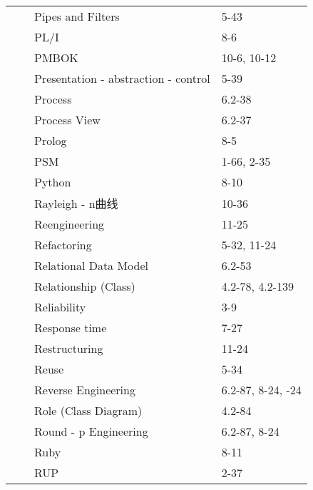 \documentclass[twocolumn]{article}
\begin{document}
\begin{tabular}{ | >{\bfseries}m{0.5em} | >{\bfseries}m{1em} | m{12em} | m{8em} |}
 &  & Pipes and Filters & 5-43\\ \cline{3-4}
 &  & PL/I & 8-6\\ \cline{3-4}
 &  & PMBOK & 10-6, 10-12\\ \cline{3-4}
 &  & Presentation - abstraction  \newline  - control & 5-39\\ \cline{3-4}
 &  & Process & 6.2-38\\ \cline{3-4}
 &  & Process View & 6.2-37\\ \cline{3-4}
 &  & Prolog & 8-5\\ \cline{3-4}
 &  & PSM & 1-66, 2-35\\ \cline{3-4}
 &  & Python & 8-10\\ \cline{2-4}
 & \multirow{14}{1em}{R \newline  \newline  \newline  \newline  \newline R \newline  \newline  \newline  \newline  \newline R} & Rayleigh - n曲线 & 10-36\\ \cline{3-4}
 &  & Reengineering & 11-25\\ \cline{3-4}
 &  & Refactoring & 5-32, 11-24\\ \cline{3-4}
 &  & Relational Data Model & 6.2-53\\ \cline{3-4}
 &  & Relationship (Class) & 4.2-78, 4.2-139\\ \cline{3-4}
 &  & Reliability & 3-9\\ \cline{3-4}
 &  & Response time & 7-27\\ \cline{3-4}
 &  & Restructuring & 11-24\\ \cline{3-4}
 &  & Reuse & 5-34\\ \cline{3-4}
 &  & Reverse Engineering & 6.2-87, 8-24,  \newline  11-24\\ \cline{3-4}
 &  & Role (Class Diagram) & 4.2-84\\ \cline{3-4}
 &  & Round - p Engineering & 6.2-87, 8-24\\ \cline{3-4}
 &  & Ruby & 8-11\\ \cline{3-4}
 &  & RUP & 2-37\\ \cline{2-4}

\end{tabular}
\end{document}
